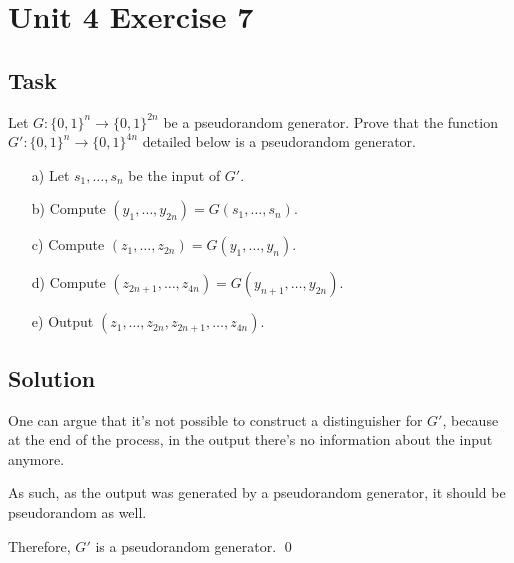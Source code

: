 \section{Unit 4 Exercise 7}

\subsection{Task}

Let $G : \{0, 1\}^n \to \{0, 1\}^{2n}$ be a pseudorandom generator. Prove that
the function $G' : \{0, 1\}^n \to \{0, 1\}^{4n}$ detailed below is a pseudorandom
generator.
\begin{enumerate}
    \item[a)] Let $s_1, \ldots, s_n$ be the input of $G'$.
    \item[b)] Compute $(y_1, \ldots, y_{2n}) = G(s_1, \ldots, s_n)$.
    \item[c)] Compute $(z_1, \ldots, z_{2n}) = G(y_1, \ldots, y_n)$.
    \item[d)] Compute $(z_{2n+1}, \ldots, z_{4n}) = G(y_{n+1}, \ldots, y_{2n})$.
    \item[e)] Output $(z_1, \ldots, z_{2n}, z_{2n+1}, \ldots, z_{4n})$.
\end{enumerate}

\subsection{Solution}

One can argue that it's not possible to construct a distinguisher for $G'$, because at the end of the process, in the output there's no information about the input anymore.

As such, as the output was generated by a pseudorandom generator, it should be pseudorandom as well.

Therefore, $G'$ is a pseudorandom generator. \qed
